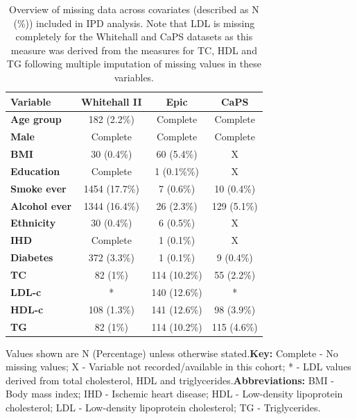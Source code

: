 \documentclass[a4paper, twoside]{templates/ociamthesis}
\begin{document}
\begin{table}[H]
\caption[missingMatrix]{\label{tab:missingMatrix-table}Overview of missing data across covariates (described as N (\%)) included in IPD analysis. Note that LDL is missing completely for the Whitehall and CaPS datasets as this measure was derived from the measures for TC, HDL and TG following multiple imputation of missing values in these variables.}
\centering
\begin{threeparttable}
\begin{tabular}[t]{>{}lccc}
\toprule
\textbf{Variable} & \textbf{Whitehall II} & \textbf{Epic} & \textbf{CaPS}\\
\midrule
\textbf{Age group} & 182 (2.2\%) & Complete & Complete\\
\textbf{Male} & Complete & Complete & Complete\\
\textbf{BMI} & 30 (0.4\%) & 60 (5.4\%) & X\\
\textbf{Education} & Complete & 1 (0.1\%\%) & X\\
\textbf{Smoke ever} & 1454 (17.7\%) & 7 (0.6\%) & 10 (0.4\%)\\
\textbf{Alcohol ever} & 1344 (16.4\%) & 26 (2.3\%) & 129 (5.1\%)\\
\textbf{Ethnicity} & 30 (0.4\%) & 6 (0.5\%) & X\\
\textbf{IHD} & Complete & 1 (0.1\%) & X\\
\textbf{Diabetes} & 372 (3.3\%) & 1 (0.1\%) & 9 (0.4\%)\\
\textbf{TC} & 82 (1\%) & 114 (10.2\%) & 55 (2.2\%)\\
\textbf{LDL-c} & * & 140 (12.6\%) & *\\
\textbf{HDL-c} & 108 (1.3\%) & 141 (12.6\%) & 98 (3.9\%)\\
\textbf{TG} & 82 (1\%) & 114 (10.2\%) & 115 (4.6\%)\\
\bottomrule
\end{tabular}
\begin{tablenotes}
\item Values shown are N (Percentage) unless otherwise stated.\newline \textbf{Key:} Complete - No missing values; X - Variable not recorded/available in this cohort; * - LDL values derived from total cholesterol, HDL and triglycerides.\newline \textbf{Abbreviations:} BMI - Body mass index; IHD - Ischemic heart disease; HDL - Low-density lipoprotein cholesterol; LDL - Low-density lipoprotein cholesterol; TG - Triglycerides.
\end{tablenotes}
\end{threeparttable}
\end{table}
\end{document}
